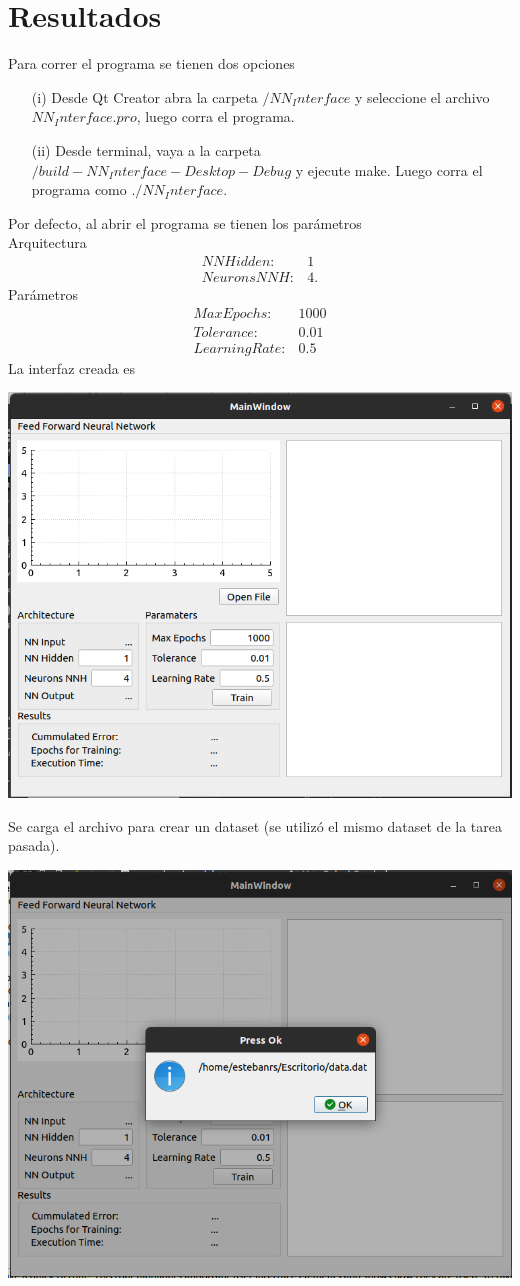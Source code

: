 \documentclass[12pt,letterpaper]{article}
\theoremstyle{definition}
\theoremstyle{definition}
\theoremstyle{definition}
\theoremstyle{definition}
\theoremstyle{definition}
\theoremstyle{definition}
\begin{document}
	\section{Resultados}
	Para correr el programa se tienen dos opciones
	\begin{itemize}
		\item[(i)] Desde Qt Creator abra la carpeta $ /NN_Interface $ y seleccione el archivo $ NN_Interface.pro $, luego corra el programa.
		\item[(ii)] Desde terminal, vaya a la carpeta $ /build-NN_Interface-Desktop-Debug $ y ejecute make. Luego corra el programa como $ ./NN_Interface $.
	\end{itemize}
	Por defecto, al abrir el programa se tienen los parámetros\\
	Arquitectura
	\begin{eqnarray*}
		NN Hidden  : & 1 \\
		Neurons NNH: & 4.
	\end{eqnarray*}
	Parámetros
	\begin{eqnarray*}
		Max Epochs  : & 1000 \\
		Tolerance   : & 0.01 \\
		Learning Rate: & 0.5
	\end{eqnarray*}
	\newpage
	La interfaz creada es
	\begin{center}
		\includegraphics[width=0.7\linewidth]{interfaz}
	\end{center}
	Se carga el archivo para crear un dataset (se utilizó el mismo dataset de la tarea pasada).
	\begin{center}
		\includegraphics[width=0.7\linewidth]{archivo}
	\end{center}
\end{document}
